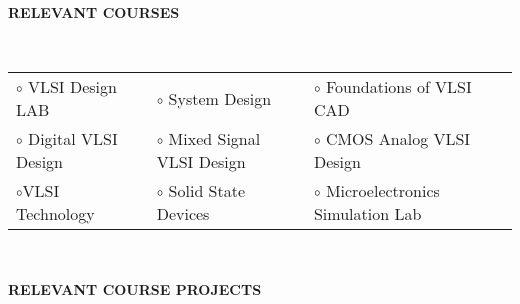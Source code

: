 \documentclass[a4paper,10pt]{article}
\begin{document}
 \colorbox{titleColor}{\parbox{6.5in}{\textbf{RELEVANT COURSES}}}\\
 
 \begin{tabular}{p{2in}p{2in}p{2.5in}}

$\circ$ VLSI Design LAB &$\circ$ System Design &$\circ$ Foundations of VLSI CAD    \\
$\circ$ Digital VLSI Design &$\circ$ Mixed Signal VLSI Design &$\circ$ CMOS Analog VLSI Design\\
$\circ$VLSI Technology &$\circ$ Solid State Devices &$\circ$ Microelectronics Simulation Lab 
\end{tabular}\\


 \colorbox{titleColor}{\parbox{6.5in}{\textbf{RELEVANT COURSE PROJECTS}}}
\end{document}
